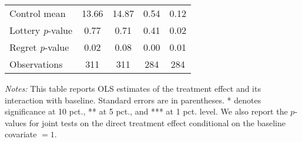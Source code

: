\begin{table}[ht]
{\begin{threeparttable}
\begin{tabular}{l*{4}{c}}
Control mean    &    13.66         &    14.87         &     0.54         &     0.12         \\
Lottery \emph{p}-value&     0.77         &     0.71         &     0.41         &     0.02         \\
Regret \emph{p}-value&     0.02         &     0.08         &     0.00         &     0.01         \\
Observations    &      311         &      311         &      284         &      284         \\
\bottomrule \end{tabular} \begin{tablenotes}[flushleft] \footnotesize \item \emph{Notes:} This table reports OLS estimates of the treatment effect and its interaction with baseline. Standard errors are in parentheses. * denotes significance at 10 pct., ** at 5 pct., and *** at 1 pct. level. We also report the \(p\)-values for joint tests on the direct treatment effect conditional on the baseline covariate $= 1$. \end{tablenotes} \end{threeparttable} } \end{table}

